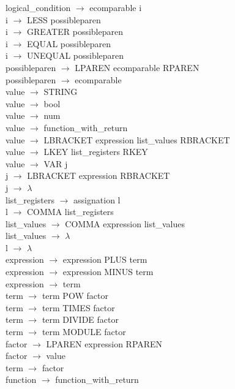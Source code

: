 \documentclass[10pt,a4paper]{article}
\begin{document}
logical\_condition $\rightarrow$ ecomparable i \\
i $\rightarrow$ LESS possibleparen \\
i $\rightarrow$ GREATER possibleparen \\
i $\rightarrow$ EQUAL possibleparen \\
i $\rightarrow$ UNEQUAL possibleparen \\
possibleparen $\rightarrow$ LPAREN ecomparable RPAREN \\
possibleparen $\rightarrow$ ecomparable \\
value $\rightarrow$ STRING \\
value $\rightarrow$ bool \\
value $\rightarrow$ num \\
value $\rightarrow$ function\_with\_return \\
value $\rightarrow$ LBRACKET expression list\_values RBRACKET \\
value $\rightarrow$ LKEY list\_registers RKEY \\
value $\rightarrow$ VAR j \\
j $\rightarrow$ LBRACKET expression RBRACKET \\
j $\rightarrow$ $\lambda$ \\
list\_registers $\rightarrow$ assignation l \\
l $\rightarrow$ COMMA list\_registers \\
list\_values $\rightarrow$ COMMA expression list\_values \\
list\_values $\rightarrow$ $\lambda$ \\
l $\rightarrow$ $\lambda$ \\
expression $\rightarrow$ expression PLUS term \\
expression $\rightarrow$ expression MINUS term \\
expression $\rightarrow$ term \\
term $\rightarrow$ term POW factor \\
term $\rightarrow$ term TIMES factor \\
term $\rightarrow$ term DIVIDE factor \\
term $\rightarrow$ term MODULE factor \\
factor $\rightarrow$ LPAREN expression RPAREN \\
factor $\rightarrow$ value \\
term $\rightarrow$ factor \\
function $\rightarrow$ function\_with\_return \\
\end{document}

